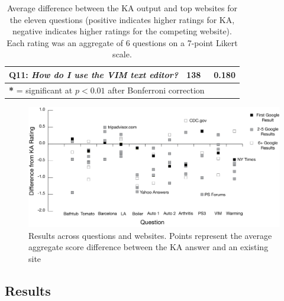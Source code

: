 \begin{table}
\begin{tabular}{l r l}
	\multicolumn{1}{p{0.75\columnwidth}}{\textbf{Q11}: \textit{How do I use the VIM text editor?}}
	& 138 & ~0.180 \\
    \hline
    \multicolumn{3}{l}{\textbf{*} = significant at $p < 0.01$ after Bonferroni correction}\\

  \end{tabular}
  \caption[Comparing KA output with top websites for the eleven questions.]{Average difference between the KA output and top websites for the eleven questions (positive indicates higher ratings for KA, negative indicates higher ratings for the competing website). Each rating was an aggregate of 6 questions on a 7-point Likert scale.}
  \label{tab:evaluation}
\end{table}

\begin{figure}
    \centering
    \includegraphics[width=1\columnwidth]{Chapters/KA/source_eval_graph}
    \caption[Results across questions and websites.]{Results across questions and websites. Points represent the average aggregate score difference between the KA answer and an existing site}
    \label{fig:aggregated}
\end{figure}

\subsection{Results}


